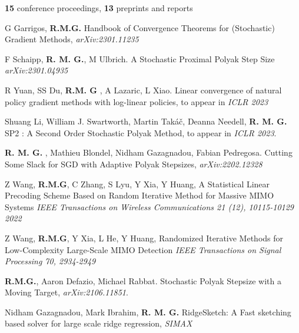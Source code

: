 \begin{bibsection}	
\item [{\bf 13} journal papers,] {\bf 15} conference proceedings, {\bf 13} preprints and reports %


\item [2023] G Garrigos, {\bf R.M.G.}
Handbook of Convergence Theorems for (Stochastic) Gradient Methods, \emph{arXiv:2301.11235}

\item  F Schaipp, {\bf R. M. G.}, M Ulbrich. A Stochastic Proximal Polyak Step Size
\emph{arXiv:2301.04935}

\item[2022]  R Yuan, SS Du,  {\bf R.M. G} , A Lazaric, L Xiao.  Linear convergence of natural policy gradient methods with log-linear policies,   to appear in  \emph{ICLR 2023}


\item Shuang Li, William J. Swartworth, Martin Takáč,  Deanna Needell,  {\bf R. M. G.}
SP2 : A Second Order Stochastic Polyak Method, to appear in \emph{ICLR 2023}.

\item {\bf R. M. G.} , Mathieu Blondel, Nidham Gazagnadou, Fabian Pedregosa. Cutting Some Slack for SGD with Adaptive Polyak Stepsizes, \emph{arXiv:2202.12328}


\item 
Z Wang,  {\bf R.M.G}, C Zhang, S Lyu, Y Xia, Y Huang, A Statistical Linear Precoding Scheme Based on Random Iterative Method for Massive MIMO Systems
\emph{IEEE Transactions on Wireless Communications 21 (12), 10115-10129		2022}

\item 
Z Wang,  {\bf R.M.G}, Y Xia, L He, Y Huang,
Randomized Iterative Methods for Low-Complexity Large-Scale MIMO Detection
\emph{IEEE Transactions on Signal Processing 70, 2934-2949}

\item[2021]   {\bf R.M.G.}, Aaron Defazio, Michael Rabbat. Stochastic Polyak Stepsize with a Moving Target,  \emph{arXiv:2106.11851}.


\item Nidham Gazagnadou, Mark Ibrahim, {\bf R. M. G.} RidgeSketch: A Fast sketching based solver for large scale ridge regression, \emph{SIMAX}


\end{bibsection}
